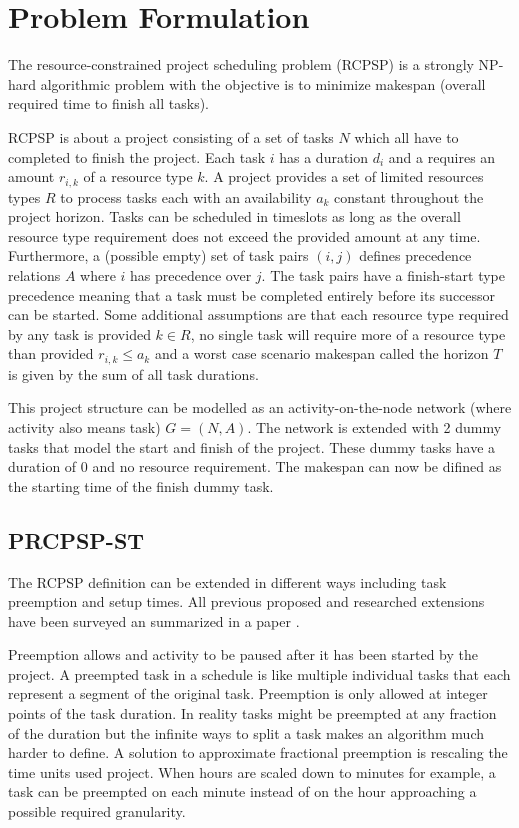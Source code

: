 \section{Problem Formulation}
The resource-constrained project scheduling problem (RCPSP) is a strongly NP-hard algorithmic problem \cite{RN20} with the objective is to minimize makespan (overall required time to finish all tasks). 

RCPSP is about a project consisting of a set of tasks \(N\) which all have to completed to finish the project. Each task \(i\) has a duration \(d_i\) and a requires an amount \(r_{i,k}\) of a resource type \(k\). A project provides a set of limited resources types \(R\) to process tasks each with an availability \(a_k\) constant throughout the project horizon. Tasks can be scheduled in timeslots as long as the overall resource type requirement does not exceed the provided amount at any time. Furthermore, a (possible empty) set of task pairs \((i,j)\) defines precedence relations \(A\) where \(i\) has precedence over \(j\). The task pairs have a finish-start type precedence meaning that a task must be completed entirely before its successor can be started. Some additional assumptions are that each resource type required by any task is provided \(k\in R\), no single task will require more of a resource type than provided \(r_{i,k}\leq a_k\) and a worst case scenario makespan called the horizon \(T\) is given by the sum of all task durations.

This project structure can be modelled as an activity-on-the-node network (where activity also means task) \(G=(N,A)\). The network is extended with 2 dummy tasks that model the start and finish of the project. These dummy tasks have a duration of 0 and no resource requirement. The makespan can now be difined as the starting time of the finish dummy task.

\subsection{PRCPSP-ST}
The RCPSP definition can be extended in different ways including task preemption and setup times. All previous proposed and researched extensions have been surveyed an summarized in a paper \cite{RN6,RN27}.

Preemption allows and activity to be paused after it has been started by the project. A preempted task in a schedule is like multiple individual tasks that each represent a segment of the original task. Preemption is only allowed at integer points of the task duration. In reality tasks might be preempted at any fraction of the duration but the infinite ways to split a task makes an algorithm much harder to define. A solution to approximate fractional preemption is rescaling the time units used project. When hours are scaled down to minutes for example, a task can be preempted on each minute instead of on the hour approaching a possible required granularity.

